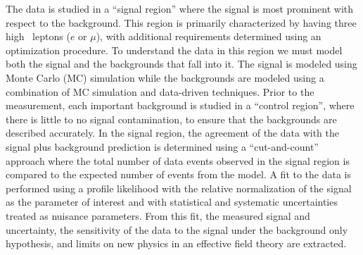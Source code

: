 The data is studied in a ``signal region'' where the signal is most prominent
with respect to the background.  This region is primarily characterized
by having three high \pt~leptons ($e$ or $\mu$), with additional
requirements determined using an optimization procedure.
To understand the data in this region we must model 
both the signal and the backgrounds that fall into it.
The signal is modeled using Monte Carlo (MC) simulation 
while the backgrounds are modeled using a combination of MC
simulation and data-driven techniques.
Prior to the measurement, each important background is 
studied in a ``control region'', where there is little to no signal contamination,
to ensure that the backgrounds are described accurately.
In the signal region, the agreement of the data 
with the signal plus background prediction is determined using 
a ``cut-and-count'' approach where the total number of data 
events observed in the signal region is compared to the expected number
of events from the model.
A fit to the data is performed using a profile likelihood
with the relative normalization of the signal as 
the parameter of interest and with statistical and systematic 
uncertainties treated as nuisance parameters.
From this fit, the measured signal \xsec and uncertainty,
the sensitivity of the data to the signal 
under the background only hypothesis,
and limits on new physics in an effective field theory 
are extracted.



                                                                                










%







